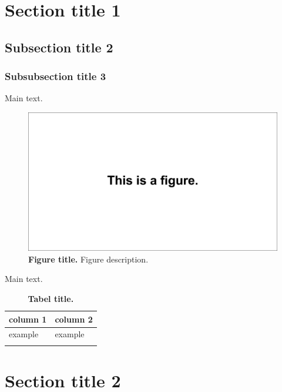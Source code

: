 \section{Section title 1}
\subsection{Subsection title 2}
\subsubsection{Subsubsection title 3}
Main text.\cite{ref1}

\begin{figure}[h]
	\label{figure1}
	\centering
	\includegraphics[width=12cm]{figures/Fig_1.eps}
	\caption{
	\textbf{Figure title. }
	Figure description.\cite{ref2}
}
\end{figure}

Main text.\cite{ref3}

\begin{doublespacing}
\captionsetup{format=plain, labelformat=table, labelsep=space} %
\begin{table}[h]
	\centering
	\caption{\textbf{Tabel title.}}
	\label{table1}
	\begin{tabular}{m{2cm}m{2cm}}
		\toprule[0.1em]
		column 1 & column 2\\ 
		\midrule[0.1em]
		\addlinespace
		example & example \\
		\addlinespace
		\bottomrule[0.1em]
	\end{tabular}
\end{table}
\end{doublespacing}

\section{Section title 2}